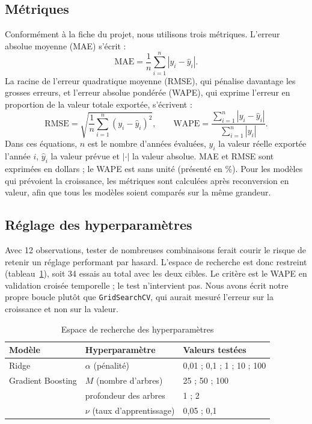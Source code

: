 \documentclass[11pt,a4paper]{article}
\begin{document}
\subsection{Métriques}
Conformément à la fiche du projet, nous utilisons trois métriques. L'erreur absolue moyenne (MAE) s'écrit :
\begin{equation}\label{eq:mae}
\mathrm{MAE}=\frac{1}{n}\sum_{i=1}^{n}\left|y_i-\widehat{y}_i\right|.
\end{equation}
La racine de l'erreur quadratique moyenne (RMSE), qui pénalise davantage les grosses erreurs, et l'erreur absolue pondérée (WAPE), qui exprime l'erreur en proportion de la valeur totale exportée, s'écrivent :
\begin{equation}\label{eq:rmse-wape}
\mathrm{RMSE}=\sqrt{\frac{1}{n}\sum_{i=1}^{n}\left(y_i-\widehat{y}_i\right)^2},
\qquad
\mathrm{WAPE}=\frac{\sum_{i=1}^{n}\left|y_i-\widehat{y}_i\right|}{\sum_{i=1}^{n}\left|y_i\right|}.
\end{equation}
Dans ces équations, $n$ est le nombre d'années évaluées, $y_i$ la valeur réelle exportée l'année $i$, $\widehat{y}_i$ la valeur prévue et $|\cdot|$ la valeur absolue. MAE et RMSE sont exprimées en dollars ; le WAPE est sans unité (présenté en \%). Pour les modèles qui prévoient la croissance, les métriques sont calculées après reconversion en valeur, afin que tous les modèles soient comparés sur la même grandeur.

\subsection{Réglage des hyperparamètres}
Avec 12 observations, tester de nombreuses combinaisons ferait courir le risque de retenir un réglage performant par hasard. L'espace de recherche est donc restreint (tableau~\ref{tab:grille}), soit 34 essais au total avec les deux cibles. Le critère est le WAPE en validation croisée temporelle ; le test n'intervient pas. Nous avons écrit notre propre boucle plutôt que \texttt{GridSearchCV}, qui aurait mesuré l'erreur sur la croissance et non sur la valeur.

\begin{table}[H]\centering\small
\caption{Espace de recherche des hyperparamètres}\label{tab:grille}
\begin{tabular}{lll}\toprule
Modèle & Hyperparamètre & Valeurs testées\\\midrule
Ridge & $\alpha$ (pénalité) & 0,01 ; 0,1 ; 1 ; 10 ; 100\\
Gradient Boosting & $M$ (nombre d'arbres) & 25 ; 50 ; 100\\
 & profondeur des arbres & 1 ; 2\\
 & $\nu$ (taux d'apprentissage) & 0,05 ; 0,1\\
\bottomrule\end{tabular}
\end{table}
\end{document}
